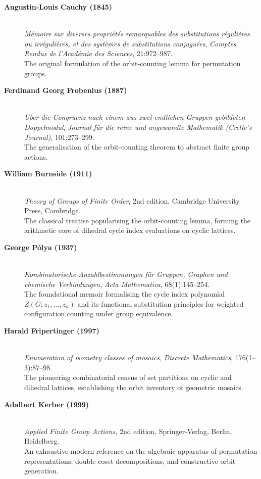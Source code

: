 \begin{description}
    \item[\textbf{Augustin-Louis Cauchy (1845)}]\mbox{}\\
    \emph{M\'emoire sur diverses propri\'et\'es remarquables des substitutions r\'eguli\`eres ou irr\'eguli\`eres, et des syst\`emes de substitutions conjugu\'ees}, \emph{Comptes Rendus de l'Acad\'emie des Sciences}, 21:972--987.\\
    The original formulation of the orbit-counting lemma for permutation groups.

    \item[\textbf{Ferdinand Georg Frobenius (1887)}]\mbox{}\\
    \emph{\"Uber die Congruenz nach einem aus zwei endlichen Gruppen gebildeten Doppelmodul}, \emph{Journal f\"ur die reine und angewandte Mathematik (Crelle's Journal)}, 101:273--299.\\
    The generalisation of the orbit-counting theorem to abstract finite group actions.

    \item[\textbf{William Burnside (1911)}]\mbox{}\\
    \emph{Theory of Groups of Finite Order}, 2nd edition, Cambridge University Press, Cambridge.\\
    The classical treatise popularising the orbit-counting lemma, forming the arithmetic core of dihedral cycle index evaluations on cyclic lattices.

    \item[\textbf{George P\'olya (1937)}]\mbox{}\\
    \emph{Kombinatorische Anzahlbestimmungen f\"ur Gruppen, Graphen und chemische Verbindungen}, \emph{Acta Mathematica}, 68(1):145--254.\\
    The foundational memoir formalising the cycle index polynomial $Z(G; z_1, \dots, z_n)$ and its functional substitution principles for weighted configuration counting under group equivalence.

    \item[\textbf{Harald Fripertinger (1997)}]\mbox{}\\
    \emph{Enumeration of isometry classes of mosaics}, \emph{Discrete Mathematics}, 176(1--3):87--98.\\
    The pioneering combinatorial census of set partitions on cyclic and dihedral lattices, establishing the orbit inventory of geometric mosaics.

    \item[\textbf{Adalbert Kerber (1999)}]\mbox{}\\
    \emph{Applied Finite Group Actions}, 2nd edition, Springer-Verlag, Berlin, Heidelberg.\\
    An exhaustive modern reference on the algebraic apparatus of permutation representations, double-coset decompositions, and constructive orbit generation.
\end{description}

